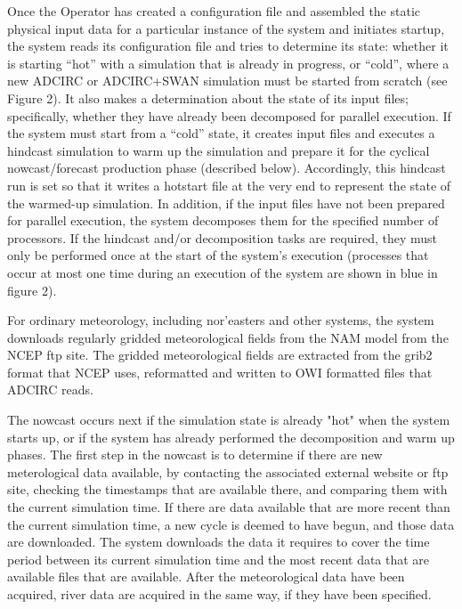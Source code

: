 \documentclass[jmse,article,submit,moreauthors,pdftex,12pt,a4paper]{mdpi}
\begin{document}
Once the Operator has created a configuration file and assembled the 
static physical input data for a particular instance of the system 
and initiates startup, the system reads its configuration file and 
tries to determine its state: whether it is starting “hot” with a 
simulation that is already in progress, or “cold”, where a new 
ADCIRC or ADCIRC+SWAN simulation must be started from scratch (see 
Figure 2). It also makes a determination about the state of its 
input files; specifically, whether they have already been decomposed 
for parallel execution. If the system must start from a “cold” 
state, it creates input files and executes a hindcast simulation to 
warm up the simulation and prepare it for the cyclical 
nowcast/forecast production phase (described below). Accordingly, 
this hindcast run is set so that it writes a hotstart file at the 
very end to represent the state of the warmed-up simulation. In 
addition, if the input files have not been prepared for parallel 
execution, the system decomposes them for the specified number of 
processors. If the hindcast and/or decomposition tasks are required, 
they must only be performed once at the start of the system's 
execution (processes that occur at most one time during an execution 
of the system are shown in blue in figure 2).

For ordinary meteorology, including nor'easters and other 
systems, the system downloads regularly gridded meteorological 
fields from the NAM model from the NCEP ftp site. The gridded 
meteorological fields are extracted from the grib2 format that NCEP 
uses, reformatted and written to OWI formatted files that ADCIRC 
reads. 

The nowcast occurs next if the simulation state is already "hot" 
when the system starts up, or if the system has already performed 
the decomposition and warm up phases. The first step in the nowcast 
is to determine if there are new meterological data available, by 
contacting the associated external website or ftp site, checking the 
timestamps that are available there, and comparing them with the 
current simulation time. If there are data available that are more 
recent than the current simulation time, a new cycle is deemed to 
have begun, and those data are downloaded. The system downloads the 
data it requires to cover the time period between its current 
simulation time and the most recent data that are available files 
that are available. After the meteorological data have been 
acquired, river data are acquired in the same way, if they have been 
specified. 
\end{document}
